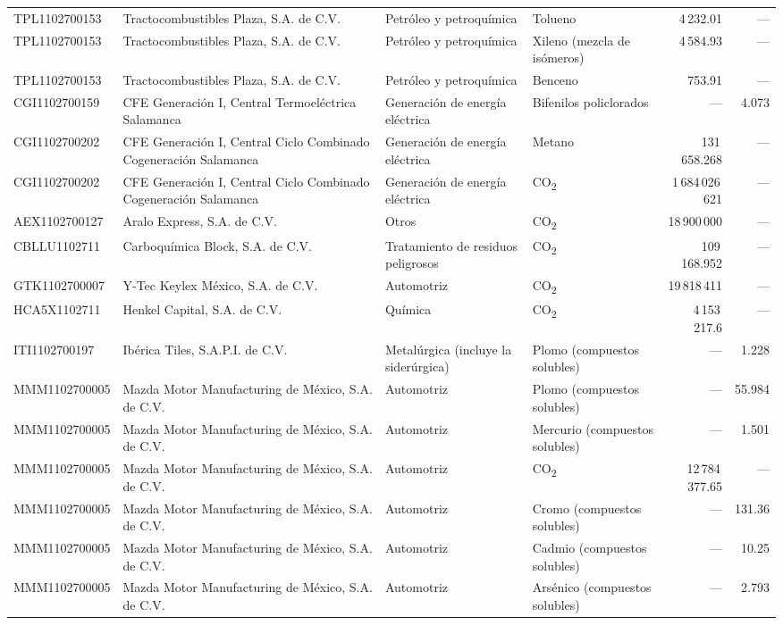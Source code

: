 {\begin{longtable}{@{}L{.15\textwidth} L{.22\textwidth} L{.14\textwidth} L{.17\textwidth} r r@{}}
TPL1102700153 & Tractocombustibles Plaza, S.A. de C.V. &
Petróleo y petroquímica & Tolueno & 4\,232.01 & --- \\
TPL1102700153 & Tractocombustibles Plaza, S.A. de C.V. &
Petróleo y petroquímica & Xileno (mezcla de isómeros) & 4\,584.93 & --- \\
TPL1102700153 & Tractocombustibles Plaza, S.A. de C.V. &
Petróleo y petroquímica & Benceno & 753.91 & --- \\
CGI1102700159 & CFE Generación I, Central Termoeléctrica Salamanca &
Generación de energía eléctrica & Bifenilos policlorados & --- & 4.073 \\
CGI1102700202 & CFE Generación I, Central Ciclo Combinado Cogeneración Salamanca &
Generación de energía eléctrica & Metano & 131\,658.268 & --- \\
CGI1102700202 & CFE Generación I, Central Ciclo Combinado Cogeneración Salamanca &
Generación de energía eléctrica & CO\textsubscript{2} & 1\,684\,026\,621 & --- \\
AEX1102700127 & Aralo Express, S.A. de C.V. & Otros &
CO\textsubscript{2} & 18\,900\,000 & --- \\
CBLLU1102711 & Carboquímica Block, S.A. de C.V. & Tratamiento de residuos peligrosos &
CO\textsubscript{2} & 109\,168.952 & --- \\
GTK1102700007 & Y-Tec Keylex México, S.A. de C.V. & Automotriz &
CO\textsubscript{2} & 19\,818\,411 & --- \\
HCA5X1102711 & Henkel Capital, S.A. de C.V. & Química &
CO\textsubscript{2} & 4\,153\,217.6 & --- \\
ITI1102700197 & Ibérica Tiles, S.A.P.I. de C.V. & Metalúrgica (incluye la siderúrgica) &
Plomo (compuestos solubles) & --- & 1.228 \\
MMM1102700005 & Mazda Motor Manufacturing de México, S.A. de C.V. & Automotriz &
Plomo (compuestos solubles) & --- & 55.984 \\
MMM1102700005 & Mazda Motor Manufacturing de México, S.A. de C.V. & Automotriz &
Mercurio (compuestos solubles) & --- & 1.501 \\
MMM1102700005 & Mazda Motor Manufacturing de México, S.A. de C.V. & Automotriz &
CO\textsubscript{2} & 12\,784\,377.65 & --- \\
MMM1102700005 & Mazda Motor Manufacturing de México, S.A. de C.V. & Automotriz &
Cromo (compuestos solubles) & --- & 131.36 \\
MMM1102700005 & Mazda Motor Manufacturing de México, S.A. de C.V. & Automotriz &
Cadmio (compuestos solubles) & --- & 10.25 \\
MMM1102700005 & Mazda Motor Manufacturing de México, S.A. de C.V. & Automotriz &
Arsénico (compuestos solubles) & --- & 2.793 \\
\end{longtable}}

